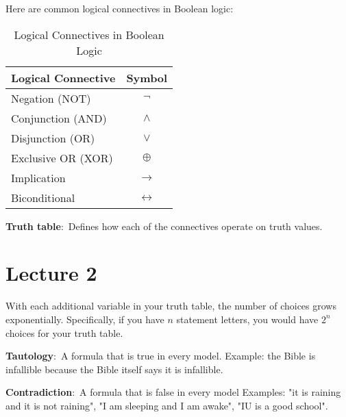 \documentclass[nobib]{tufte-handout}
\newcommand{\defn}[2]{\noindent\textbf{#1}:\ #2}
\begin{document}
Here are common logical connectives in Boolean logic:
\begin{table}[h]
    \centering
    \begin{tabular}{lc}
    \toprule
    \textbf{Logical Connective} & \textbf{Symbol} \\
    \midrule
    Negation (NOT) & $\lnot$ \\
    Conjunction (AND) & $\land$ \\
    Disjunction (OR) & $\lor$ \\
    Exclusive OR (XOR) & $\oplus$ \\
    Implication & $\rightarrow$ \\
    Biconditional & $\leftrightarrow$ \\
    \bottomrule
    \end{tabular}
    \caption{Logical Connectives in Boolean Logic}
    \label{tab:logical-connectives}
\end{table}

\defn{Truth table}{Defines how each of the
connectives operate on truth values.}

\section{Lecture 2}

With each additional variable in your truth table, the number
of choices grows exponentially. Specifically, if you have $n$ statement
letters, you would have $2^n$ choices for your truth table. 

\defn{Tautology}{A formula that is true in every model.} 
Example: the Bible is infallible because the Bible itself
says it is infallible.  

\defn{Contradiction}{A formula that is false in every model} Examples:
"it is raining and it is not raining", "I am sleeping and I am awake", 
"IU is a good school". 
\end{document}
